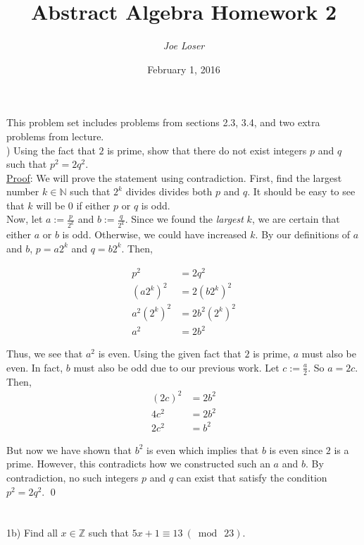 \documentclass{article}
\title{Abstract Algebra Homework 2}
\author{\textit{Joe Loser}}
\date{February 1, 2016}
\begin{document}
\maketitle

\noindent This problem set includes problems from sections 2.3, 3.4, and two extra problems from lecture.  \\

) Using the fact that $2$ is prime, show that there do not exist integers $p$ and $q$ such that $p^{2} = 2q^{2}$. \\

\noindent
\underline{Proof}: We will prove the statement using contradiction. First, find the largest number $k \in \mathbb{N}$ such that $2^{k}$ divides divides both $p$ and $q$.  It should be easy to see that $k$ will be $0$ if either $p$ or $q$ is odd. \\

\noindent
Now, let $a := \frac{p}{2^{k}}$ and $b := \frac{q}{2^{k}}$. Since we found the \textit{largest} $k$, we are certain that either $a$ or $b$ is odd.  Otherwise, we could have increased $k$. By our definitions of $a$ and $b$, $p = a 2^{k}$ and $q = b 2^{k}$. Then,

\begin{align*}
p^{2} &= 2q^{2} \\
(a 2^{k})^{2} &= 2(b 2^{k})^{2} \\
a^{2} (2^{k})^{2} &= 2b^{2}(2^{k})^2 \\
a^{2} &= 2b^{2}
\end{align*}

\noindent
Thus, we see that $a^{2}$ is even.  Using the given fact that $2$ is prime, $a$ must also be even. In fact, $b$ must also be odd due to our previous work. Let $c := \frac{a}{2}$. So $a = 2c$. Then,
\begin{align*}
(2c)^{2} &= 2b^{2} \\
4c^{2} &= 2b^{2} \\
2c^{2} &= b^{2}
\end{align*}

\noindent
But now we have shown that $b^{2}$ is even which implies that $b$ is even since $2$ is a prime. However, this contradicts how we constructed such an $a$ and $b$. By contradiction, no such integers $p$ and $q$ can exist that satisfy the condition $p^{2} = 2q^{2}$. \qed \\ \\ \\

\noindent 1b) Find all $x \in \mathbb{Z}$ such that $5x + 1 \equiv 13\ (\bmod\ 23) $. \\
\end{document}
